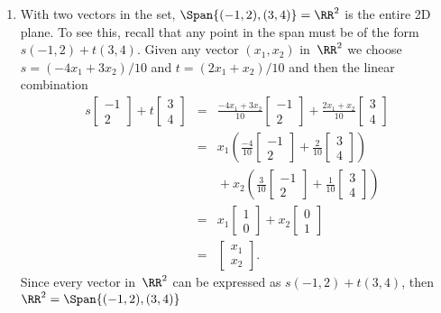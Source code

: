 \begin{example}
\begin{enumerate}
\item With two vectors in the set, \(\Span\{(-1,2),(3,4)\}=\RR^2\) is the entire 2D plane.
To see this, recall that any point in the span must be of the form \(s(-1,2)+t(3,4)\).
Given any vector \((x_1,x_2)\) in~\(\RR^2\) we choose \(s=(-4x_1+3x_2)/10\) and \(t=(2x_1+x_2)/10\) and then the linear combination
\begin{eqnarray*}
s\begin{bmatrix} -1\\2 \end{bmatrix}+t\begin{bmatrix} 3\\4 \end{bmatrix}
&=&\frac{-4x_1+3x_2}{10}\begin{bmatrix} -1\\2 \end{bmatrix}+\frac{2x_1+x_2}{10}\begin{bmatrix} 3\\4 \end{bmatrix}
\\&=&x_1\left(\frac{-4}{10}\begin{bmatrix} -1\\2 \end{bmatrix}+\frac{2}{10}\begin{bmatrix} 3\\4 \end{bmatrix}\right)
\\&&{}
+x_2\left(\frac{3}{10}\begin{bmatrix} -1\\2 \end{bmatrix}+\frac{1}{10}\begin{bmatrix} 3\\4 \end{bmatrix}\right)
\\&=&x_1\begin{bmatrix} 1\\0 \end{bmatrix}
+x_2\begin{bmatrix} 0\\1 \end{bmatrix}
\\&=&\begin{bmatrix} x_1\\x_2 \end{bmatrix}.
\end{eqnarray*}
Since every vector in~\(\RR^2\) can be expressed as \(s(-1,2)+t(3,4)\), then \(\RR^2=\Span\{(-1,2),(3,4)\}\)


\end{enumerate}
\end{example}
